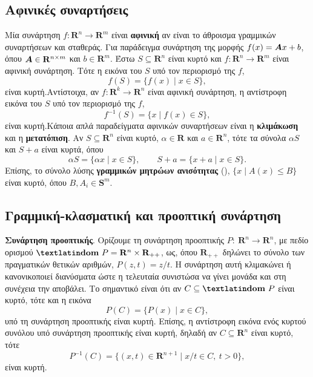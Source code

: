 \subsection{Αφινικές συναρτήσεις} Μία συνάρτηση $f:\mathbf{R}^n \to \mathbf{R}^m$
είναι \textbf{αφινική} αν είναι το άθροισμα γραμμικών συναρτήσεων και σταθεράς.
Για παράδειγμα συνάρτηση της μορφής $f(x) = \boldsymbol{A}x + b$, όπου $\boldsymbol{A} \in
\mathbf{R}^{n\times m}$ και $b \in \mathbf{R}^m$. Έστω $S \subseteq
\mathbf{R}^n$ είναι κυρτό και $f:\mathbf{R}^n \to \mathbf{R}^m$ είναι αφινική
συνάρτηση. Τότε η εικόνα του $S$ υπό τον περιορισμό της $f$,
\begin{equation*}
    f(S) = \{ f(x) \mid x \in S\},
\end{equation*}
είναι κυρτή.Αντίστοιχα, αν $f:\mathbf{R}^k \to \mathbf{R}^n$ είναι αφινική
συνάρτηση, η αντίστροφη εικόνα του $S$ υπό τον περιορισμό της $f$,
\begin{equation*}
    f^{-1}(S) = \{ x \mid f(x) \in S\},
\end{equation*}
είναι κυρτή.Κάποια απλά παραδείγματα αφινικών συναρτήσεων είναι η
\textbf{κλιμάκωση} και η \textbf{μετατόπιση}. Αν $S \subseteq \mathbf{R}^n$
είναι κυρτό, $\alpha \in \mathbf{R}$ και $a \in \mathbf{R}^n$, τότε τα σύνολα
$\alpha S$ και $S + a$ είναι κυρτά, όπου
\begin{equation*}
    \alpha S = \{\alpha x \mid x\in S\}, \qquad S + a = \{x + a \mid x\in S\}.
\end{equation*}
Επίσης, το σύνολο λύσης \textbf{γραμμικών μητρώων ανισότητας}
(), $\{x\mid A(x) \leq B\}$ είναι
κυρτό, όπου $B, A_i \in \mathbf{S}^m$.

\subsection{Γραμμική-κλασματική και προοπτική συνάρτηση}

\textbf{Συνάρτηση προοπτικής}. Ορίζουμε τη συνάρτηση προοπτικής $P :\
\mathbf{R}^n \to \mathbf{R}^n$, με πεδίο ορισμού $\textbf{\tl{dom}} \ P =
\mathbf{R}^n \times \mathbf{R}_{++}$, ως, όπου $\mathbf{R}_{++}$ δηλώνει το
σύνολο των πραγματικών θετικών αριθμών, $P(z, t) = z/t$. Η συνάρτηση αυτή
κλιμακώνει ή κανονικοποιεί διανύσματα ώστε η τελευταία συνιστώσα να γίνει μονάδα
και στη συνέχεια την αποβάλει. Το σημαντικό είναι ότι αν $C \subseteq
\textbf{\tl{dom}}\ P$ είναι κυρτό, τότε και η εικόνα
\begin{equation*}
    P(C) = \{P(x) \mid x \in C\},
\end{equation*}
υπό τη συνάρτηση προοπτικής είναι κυρτή. Επίσης, η αντίστροφη εικόνα ενός κυρτού
συνόλου υπό συνάρτηση προοπτικής είναι κυρτή, δηλαδή αν $C \subseteq
\mathbf{R}^n$ είναι κυρτό, τότε
\begin{equation*}
    P^{-1}(C) = \{(x, t) \in \mathbf{R}^{n + 1} \mid x/t \in C,\ t > 0\},
\end{equation*}
είναι κυρτή.

